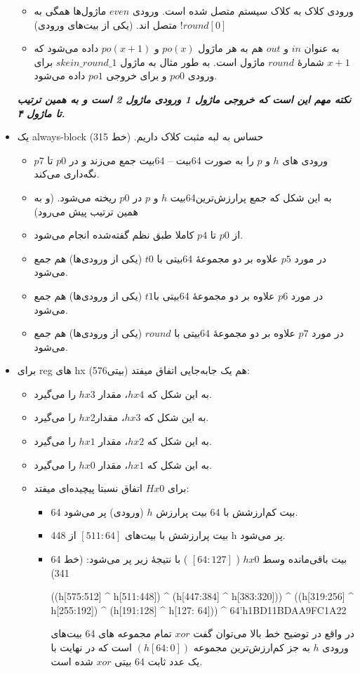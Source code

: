 \begin{itemize}
 \begin{itemize}
 \item ورودی کلاک به کلاک سیستم متصل شده است.
ورودی $ even$ ماژول‌ها همگی به  $!round[0]$ متصل اند. (یکی از بیت‌های ورودی)
\item
به عنوان $in$ و $ out $ هم به هر ماژول $po(x)$ و $po(x+1)$ داده می‌شود که $x+1$ شمارهٔ $ round$ ماژول است. به طور مثال به ماژول $skein\_round\_1$ برای ورودی $po0$ و برای خروجی $po1$ داده می‌شود.
 \end{itemize}
\textit{\textbf{ نکته مهم این است که خروجی ماژول 1 ورودی ماژول 2 است و به همین ترتیب تا ماژول ۴.
}}
\item
یک always-block حساس به لبه مثبت کلاک داریم. (خط 315)
\begin{itemize}
\item
ورودی های $h $ و $p $ را به صورت 64بیت – 64بیت جمع می‌زند و در $p0$ تا $p7$ نگه‌داری می‌کند.
\item
به این شکل که جمع پرارزش‌ترین64بیت $h$ و $p$ در $p0$ ریخته می‌شود. (و به همین ترتیب پیش می‌رود)
\item
از $p0$ تا $p4$ کاملا طبق نظم گفته‌شده انجام می‌شود.
\item
در مورد $p5$ علاوه بر دو مجموعهٔ 64بیتی با $t0$ (یکی از ورودی‌ها) هم جمع می‌شود.
\item
در مورد $ p6$ علاوه بر دو مجموعهٔ 64بیتی با$ t1$ (یکی از ورودی‌ها) هم جمع می‌شود.
\item
در مورد $ p7 $ علاوه بر دو مجموعهٔ 64بیتی با $round$ (یکی از ورودی‌ها) هم جمع می‌شود.
\end{itemize}
\item
برای reg های hx (576بیتی) هم یک جابه‌جایی اتفاق میفتد:
\begin{itemize}
\item
به این شکل که $hx4$، مقدار $hx3$ را می‌گیرد.
\item
به این شکل که $hx3$، مقدار$ hx2$ را می‌گیرد.
\item
به این شکل که $hx2$، مقدار $hx1$ را می‌گیرد.
\item
به این شکل که $hx1$، مقدار $hx0$ را می‌گیرد.
\item
برای $Hx0$ اتفاق نسبتا پیچیده‌ای میفتد:
\begin{itemize}
\item
64 بیت کم‌ارزشش با 64 بیت پرارزش $h$ (ورودی) پر می‌شود.
\item
448 بیت پرارزشش  با بیت‌های $[511:64]$ از h پر می‌شود.
\item
64 بیت باقی‌مانده وسط $hx0$ ( $[64:127]$ ) با نتیجهٔ زیر پر می‌شود:  (خط 341)
\begin{code}
((h[575:512] ^ h[511:448]) ^ (h[447:384] ^ h[383:320])) ^ ((h[319:256] ^ h[255:192]) ^  (h[191:128] ^ h[127: 64])) ^ 64'h1BD11BDAA9FC1A22
\end{code}

در واقع در توضیح خط بالا می‌توان گفت $ xor$ تمام مجموعه های 64 بیت‌های ورودی $h $ به جز کم‌ارزش‌ترین مجموعه $( h[64:0] )$ است که در نهایت با یک عدد ثابت 64 بیتی $ xor$ شده است.

\end{itemize}
\end{itemize}
\end{itemize}

